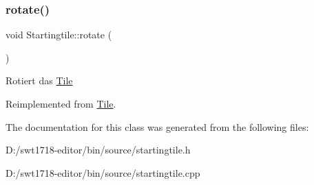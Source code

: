 \subsubsection{\texorpdfstring{rotate()}{rotate()}}
{\footnotesize\ttfamily void Startingtile\+::rotate (\begin{DoxyParamCaption}{ }\end{DoxyParamCaption})\hspace{0.3cm}{\ttfamily [virtual]}}

Rotiert das \mbox{\hyperlink{class_tile}{Tile}} 

Reimplemented from \mbox{\hyperlink{class_tile_a15c3d8260c8950d3461e3ba2849cd141}{Tile}}.



The documentation for this class was generated from the following files\+:\begin{DoxyCompactItemize}
\item 
D\+:/swt1718-\/editor/bin/source/startingtile.\+h\item 
D\+:/swt1718-\/editor/bin/source/startingtile.\+cpp\end{DoxyCompactItemize}

